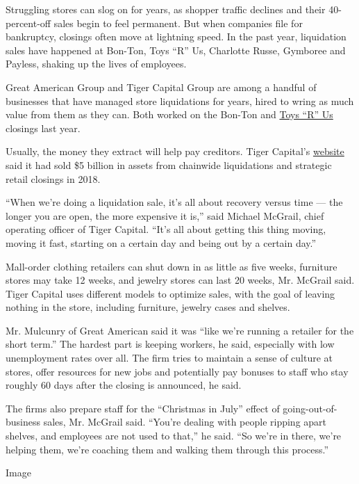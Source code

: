 Struggling stores can slog on for years, as shopper traffic declines and
their 40-percent-off sales begin to feel permanent. But when companies
file for bankruptcy, closings often move at lightning speed. In the past
year, liquidation sales have happened at Bon-Ton, Toys ``R'' Us,
Charlotte Russe, Gymboree and Payless, shaking up the lives of
employees.

Great American Group and Tiger Capital Group are among a handful of
businesses that have managed store liquidations for years, hired to
wring as much value from them as they can. Both worked on the Bon-Ton
and
\href{https://www.nytimes3xbfgragh.onion/2018/06/30/business/toys-r-us-closing.html}{Toys
``R'' Us} closings last year.

Usually, the money they extract will help pay creditors. Tiger Capital's
\href{https://www.tigergroup.com/services/retail-dispositions/}{website}
said it had sold \$5 billion in assets from chainwide liquidations and
strategic retail closings in 2018.

``When we're doing a liquidation sale, it's all about recovery versus
time --- the longer you are open, the more expensive it is,'' said
Michael McGrail, chief operating officer of Tiger Capital. ``It's all
about getting this thing moving, moving it fast, starting on a certain
day and being out by a certain day.''

Mall-order clothing retailers can shut down in as little as five weeks,
furniture stores may take 12 weeks, and jewelry stores can last 20
weeks, Mr. McGrail said. Tiger Capital uses different models to optimize
sales, with the goal of leaving nothing in the store, including
furniture, jewelry cases and shelves.

Mr. Mulcunry of Great American said it was ``like we're running a
retailer for the short term.'' The hardest part is keeping workers, he
said, especially with low unemployment rates over all. The firm tries to
maintain a sense of culture at stores, offer resources for new jobs and
potentially pay bonuses to staff who stay roughly 60 days after the
closing is announced, he said.

The firms also prepare staff for the ``Christmas in July'' effect of
going-out-of-business sales, Mr. McGrail said. ``You're dealing with
people ripping apart shelves, and employees are not used to that,'' he
said. ``So we're in there, we're helping them, we're coaching them and
walking them through this process.''

Image

